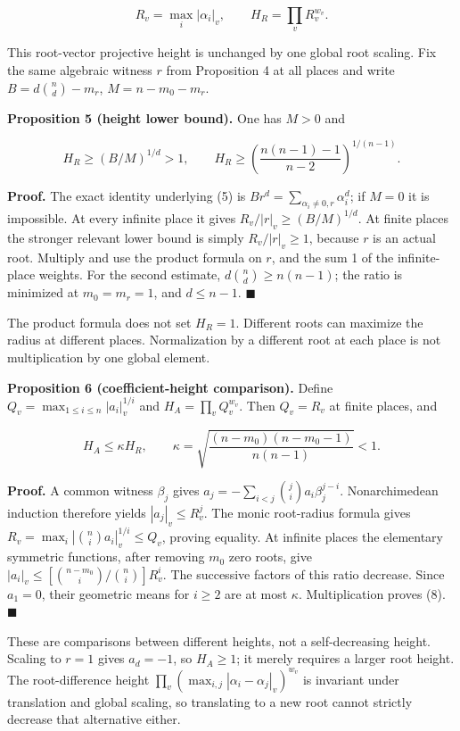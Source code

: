\documentclass[
  british,
  10pt,
]{article}
\begin{document}
\[
 R_v=\max_i|\alpha_i|_v,\qquad H_R=\prod_vR_v^{w_v}.
\]

This root-vector projective height is unchanged by one global root
scaling. Fix the same algebraic witness \(r\) from Proposition 4 at all
places and write \(B=d\binom nd-m_r\), \(M=n-m_0-m_r\).

\textbf{Proposition 5 (height lower bound).} One has \(M>0\) and

\[
 H_R\ge(B/M)^{1/d}>1,
 \qquad H_R\ge
 \left(\frac{n(n-1)-1}{n-2}\right)^{1/(n-1)}.             \tag{7}
\]

\textbf{Proof.} The exact identity underlying (5) is
\(Br^d=\sum_{\alpha_i\ne0,r}\alpha_i^d\); if \(M=0\) it is impossible.
At every infinite place it gives \(R_v/|r|_v\ge(B/M)^{1/d}\). At finite
places the stronger relevant lower bound is simply \(R_v/|r|_v\ge1\),
because \(r\) is an actual root. Multiply and use the product formula on
\(r\), and the sum 1 of the infinite-place weights. For the second
estimate, \(d\binom nd\ge n(n-1)\); the ratio is minimized at
\(m_0=m_r=1\), and \(d\le n-1\). \(\blacksquare\)

The product formula does not set \(H_R=1\). Different roots can maximize
the radius at different places. Normalization by a different root at
each place is not multiplication by one global element.

\textbf{Proposition 6 (coefficient-height comparison).} Define
\(Q_v=\max_{1\le i\le n}|a_i|_v^{1/i}\) and \(H_A=\prod_vQ_v^{w_v}\).
Then \(Q_v=R_v\) at finite places, and

\[
 H_A\le\kappa H_R,\qquad
 \kappa=\sqrt{\frac{(n-m_0)(n-m_0-1)}{n(n-1)}}<1.         \tag{8}
\]

\textbf{Proof.} A common witness \(\beta_j\) gives
\(a_j=-\sum_{i<j}\binom ji a_i\beta_j^{j-i}\). Nonarchimedean induction
therefore yields \(|a_j|_v\le R_v^j\). The monic root-radius formula
gives \(R_v=\max_i|\binom ni a_i|_v^{1/i}\le Q_v\), proving equality. At
infinite places the elementary symmetric functions, after removing
\(m_0\) zero roots, give \(|a_i|_v\le[\binom{n-m_0}i/\binom ni]R_v^i\).
The successive factors of this ratio decrease. Since \(a_1=0\), their
geometric means for \(i\ge2\) are at most \(\kappa\). Multiplication
proves (8). \(\blacksquare\)

These are comparisons between different heights, not a self-decreasing
height. Scaling to \(r=1\) gives \(a_d=-1\), so \(H_A\ge1\); it merely
requires a larger root height. The root-difference height
\(\prod_v(\max_{i,j}|\alpha_i-\alpha_j|_v)^{w_v}\) is invariant under
translation and global scaling, so translating to a new root cannot
strictly decrease that alternative either.
\end{document}
